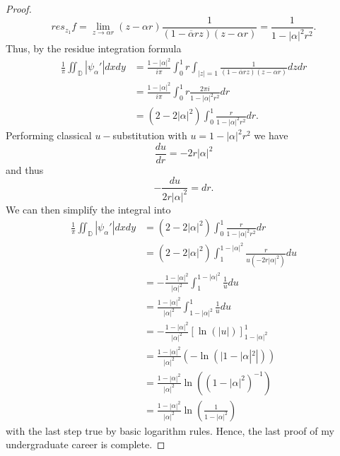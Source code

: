 \documentclass{article}
\begin{document}
\begin{proof}
     \[
     res_{z_1}f = \lim\limits_{z \to \alpha r}( z - \alpha r) \frac{1}{(1 - \overline{\alpha} rz)(z - \alpha r)} = \frac{1}{1 - |\alpha|^2r^2}. 
     \]
     Thus, by the residue integration formula
     \begin{align*}
      \frac{1}{\pi}\iint_{\mathbb{D}}|\psi_{\alpha}'|dxdy &= \frac{1 - |\alpha|^2}{i \pi}\int_0^1 r \int_{|z| = 1} \frac{1}{(1 - \overline{\alpha} r z)(z - \alpha r)}dzdr \\
      &= \frac{1 - |\alpha|^2}{i\pi} \int_0^1 r \frac{2\pi i }{1 - |\alpha|^2r^2}dr \\
      &= (2 - 2|\alpha|^2)\int_0^1 \frac{r}{1 - |\alpha|^2r^2}dr.
     \end{align*}
     Performing classical $u-$substitution with $u = 1 - |\alpha|^2r^2$ we have 
     \[
     \frac{du}{dr} = -2r|\alpha|^2
     \]
     and thus
     \[
     -\frac{du}{2r|\alpha|^2} = dr. 
     \]
     We can then simplify the integral into 
     \begin{align*}
      \frac{1}{\pi}\iint_{\mathbb{D}}|\psi_{\alpha}'|dxdy &= (2 - 2|\alpha|^2)\int_0^1 \frac{r}{1 - |\alpha|^2r^2}dr \\
      &= (2 - 2|\alpha|^2)\int_1^{1 - |\alpha|^2}\frac{r}{u(-2r|\alpha|^2)}du \\
      &= -\frac{1 - |\alpha|^2}{|\alpha|^2}\int_1^{1 - |\alpha|^2} \frac{1}{u}du \\
      &= \frac{1 - |\alpha|^2}{|\alpha|^2} \int_{1 - |\alpha|^2}^1 \frac{1}{u}du \\
      &= -\frac{1 - |\alpha|^2}{|\alpha|^2}\left[\ln(|u|)\right]_{1 - |\alpha|^2}^{1} \\
      &= \frac{1 - |\alpha|^2}{|\alpha|^2}(-\ln(|1 - |\alpha|^2|)) \\
      &= \frac{1 - |\alpha|^2}{|\alpha|^2}\ln((1 - |\alpha|^2)^{-1}) \\
      &= \frac{1 - |\alpha|^2}{|\alpha|^2}\ln\left(\frac{1}{1 - |\alpha|^2}\right)
     \end{align*}
     with the last step true by basic logarithm rules. 
     Hence, the last proof of my undergraduate career is complete. 
    
\end{proof}
\end{document}
